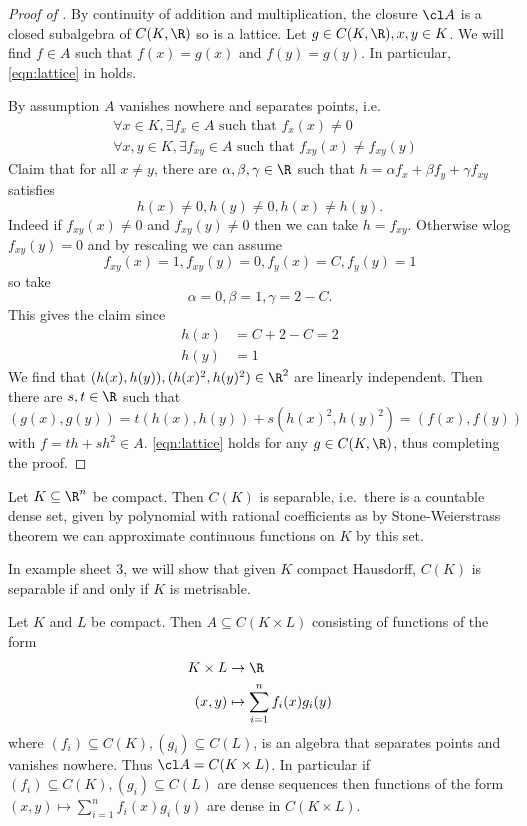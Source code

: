 \documentclass[a4paper]{article}
\begin{document}
\begin{proof}[Proof of ]
  By continuity of addition and multiplication, the closure \(\cl A\) is a closed subalgebra of \(C(K, \R)\) so is a lattice. Let \(g \in C(K, \R), x, y \in K\). We will find \(f \in A\) such that \(f(x) = g(x)\) and \(f(y) = g(y)\). In particular, \eqref{eqn:lattice} in  holds.

  By assumption \(A\) vanishes nowhere and separates points, i.e.\
  \begin{align*}
    & \forall x \in K, \exists f_x \in A \text{ such that } f_x(x) \neq 0 \\
    & \forall x, y \in K, \exists f_{xy} \in A \text{ such that } f_{xy}(x) \neq f_{xy}(y)
  \end{align*}
  Claim that for all \(x \neq y\), there are \(\alpha, \beta, \gamma \in \R\) such that \(h = \alpha f_x + \beta f_y + \gamma f_{xy}\) satisfies
  \[
    h(x) \neq 0, h(y) \neq 0, h(x) \neq h(y).
  \]
  Indeed if \(f_{xy}(x) \neq 0\) and \(f_{xy}(y) \neq 0\) then we can take \(h = f_{xy}\). Otherwise wlog \(f_{xy}(y) = 0\) and by rescaling we can assume
  \[
    f_{xy}(x) = 1, f_{xy}(y) = 0, f_y(x) = C, f_y(y) = 1
  \]
  so take
  \[
    \alpha = 0, \beta = 1, \gamma = 2 - C.
  \]
  This gives the claim since
  \begin{align*}
    h(x) &= C + 2 - C = 2 \\
    h(y) &= 1
  \end{align*}
  We find that \((h(x), h(y)), (h(x)^2, h(y)^2) \in \R^2\) are linearly independent. Then there are \(s, t \in \R\) such that
  \[
    (g(x), g(y)) = t (h(x), h(y)) + s (h(x)^2, h(y)^2) = (f(x), f(y))
  \]
  with \(f = th + sh^2 \in A\). \eqref{eqn:lattice} holds for any \(g \in C(K, \R)\), thus completing the proof.
\end{proof}

\begin{eg}
  Let \(K \subseteq \R^n\) be compact. Then \(C(K)\) is separable, i.e.\ there is a countable dense set, given by polynomial with rational coefficients as by Stone-Weierstrass theorem we can approximate continuous functions on \(K\) by this set.

  In example sheet 3, we will show that given \(K\) compact Hausdorff, \(C(K)\) is separable if and only if \(K\) is metrisable.
\end{eg}

\begin{eg}
  Let \(K\) and \(L\) be compact. Then \(A \subseteq C(K \times L)\) consisting of functions of the form
  \begin{align*}
    K \times L &\to \R \\
    (x, y) &\mapsto \sum_{i = 1}^n f_i(x) g_i(y)
  \end{align*}
  where \((f_i) \subseteq C(K), (g_i) \subseteq C(L)\), is an algebra that separates points and vanishes nowhere. Thus \(\cl A = C(K \times L)\). In particular if \((f_i) \subseteq C(K), (g_i) \subseteq C(L)\) are dense sequences then functions of the form \((x, y) \mapsto \sum_{i = 1}^n f_i(x)g_i(y)\) are dense in \(C(K \times L)\).
\end{eg}
\end{document}
